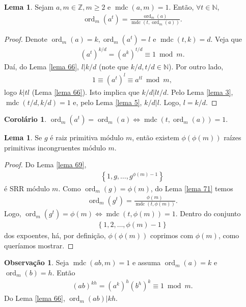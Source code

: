 \documentclass[a4paper,11pt,twoside, leqno]{article}
\DeclareMathOperator{\mdc}{mdc}
\DeclareMathOperator{\Ord}{ord}
\theoremstyle{definition}
\newtheorem{corollary}{Corolário}[theorem]
\newtheorem{lemma}[theorem]{Lema}
\newtheorem{remark}{Observação}[section]
\begin{document}
\begin{lemma}
	\label{lema 71} Sejam $a,m\in\mathbb{Z}, m\geq 2$ e $\mdc(a,m) = 1$. Então, $\forall t\in\mathbb{N}$,
	\begin{align*}
	\Ord_m(a^t) = \frac{\Ord_m(a)}{\mdc(t,\Ord_m(a))}.
	\end{align*}
\end{lemma}
\begin{proof}
	Denote $\Ord_m(a) = k, \Ord_m(a^t) = l$ e $\mdc(t,k) = d$. Veja que
	\begin{align*}
	\left( a^t \right)^{k/d} = \left( a^k \right)^{t/d} \equiv 1\bmod m.
	\end{align*}
	Daí, do Lema \eqref{lema 66}, $l|k/d$ (note que $k/d, t/d\in\mathbb{N}$). Por outro lado,
	\begin{align*}
	1\equiv (a^t)^l\equiv a^{tl}\bmod m,
	\end{align*} 
	logo $k|tl$ (Lema \eqref{lema 66}). Isto implica que $k/d|lt/d$. Pelo Lema \eqref{lema 3}, $\mdc(t/d,k/d) = 1$ e, pelo Lema \eqref{lema 5}, $k/d|l$. Logo, $l = k/d$.
\end{proof}
\begin{corollary}
	$\Ord_m(a^t) = \Ord_m(a)\Leftrightarrow \mdc(t,\Ord_m(a)) = 1$.
\end{corollary}
\begin{lemma}
	\label{lema 72}
	Se $g$ é raiz primitiva módulo $m$, então existem $\phi(\phi(m))$ raízes primitivas incongruentes módulo $m$.
\end{lemma}
\begin{proof}
	Do Lema \eqref{lema 69},
	\begin{align*}
	\left\{ 1,g,\dots,g^{\phi(m) - 1} \right\}
	\end{align*}
	é SRR módulo $m$. Como $\Ord_m(g) = \phi(m)$, do Lema \eqref{lema 71} temos
	\begin{align*}
	\Ord_m(g^t) = \frac{\phi(m)}{\mdc(t,\phi(m))}.
	\end{align*}
	Logo, $\Ord_m(g^t) = \phi(m)\Leftrightarrow \mdc(t,\phi(m)) = 1$. Dentro do conjunto
	\begin{align*}
	\left\{ 1,2,\dots,\phi(m)- 1 \right\}
	\end{align*}
	dos expoentes, há, por definição, $\phi(\phi(m))$ coprimos com $\phi(m)$, como queríamos mostrar.
\end{proof}
\begin{remark}
	Seja $\mdc(ab,m) = 1$ e assuma $\Ord_m(a) = k$ e $\Ord_m(b) = h$. Então
	\begin{align*}
	(ab)^{kh} = (a^k)^h(b^h)^k\equiv 1\bmod m.
	\end{align*}
	Do Lema \eqref{lema 66}, $\Ord_m(ab)|kh$.
\end{remark}
\end{document}
